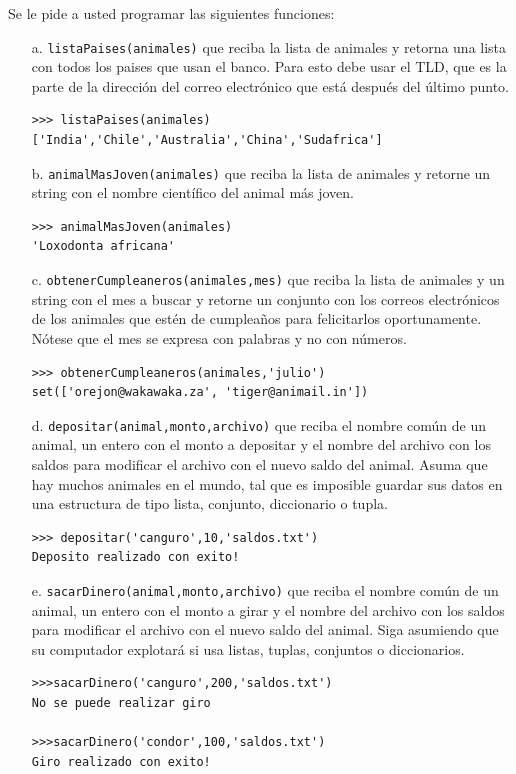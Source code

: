 Se le pide a usted programar las siguientes funciones:

\begin{itemize}
    \item[a.] \texttt{listaPaises(animales)} que reciba la lista de animales y retorna una lista con todos los paises que usan el banco. Para esto debe usar el TLD, que es la parte de la dirección del correo electrónico que está después del último punto.
    \begin{lstlisting}[style=consola]
>>> listaPaises(animales)
['India','Chile','Australia','China','Sudafrica']    
    \end{lstlisting}
    \item[b.] \texttt{animalMasJoven(animales)} que reciba la lista de animales y retorne un string con el nombre científico del animal más joven.
    \begin{lstlisting}[style=consola]
>>> animalMasJoven(animales)
'Loxodonta africana'
    \end{lstlisting}
    \item[c.] \texttt{obtenerCumpleaneros(animales,mes)} que reciba la lista de animales y un string con el mes a buscar y retorne un conjunto con los correos electrónicos de los animales que estén de cumpleaños para  felicitarlos oportunamente. Nótese que el mes se expresa con palabras y no con números.
    \begin{lstlisting}[style=consola]
>>> obtenerCumpleaneros(animales,'julio')
set(['orejon@wakawaka.za', 'tiger@animail.in'])
    \end{lstlisting}
    \item[d.] \texttt{depositar(animal,monto,archivo)} que reciba el nombre común de un animal, un entero con el monto a depositar y el nombre del archivo con los saldos para modificar el archivo con el nuevo saldo del animal. Asuma que hay muchos animales en el mundo, tal que es imposible guardar sus datos en una estructura de tipo lista, conjunto, diccionario o tupla.
    \begin{lstlisting}[style=consola]
>>> depositar('canguro',10,'saldos.txt')
Deposito realizado con exito!
    \end{lstlisting}
    \item[e.] \texttt{sacarDinero(animal,monto,archivo)} que reciba el nombre común de un animal, un entero con el monto a girar y el nombre del archivo con los saldos para modificar el archivo con el nuevo saldo del animal. Siga asumiendo que su computador explotará si usa listas, tuplas, conjuntos o diccionarios.
    \begin{lstlisting}[style=consola]
>>>sacarDinero('canguro',200,'saldos.txt')
No se puede realizar giro

>>>sacarDinero('condor',100,'saldos.txt')
Giro realizado con exito!
    \end{lstlisting}
\end{itemize}